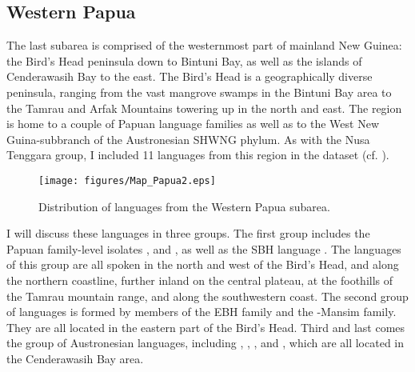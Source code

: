 \subsection{Western Papua}\label{sec:westpapua2}

The last subarea is comprised of the westernmost part of mainland New Guinea: the Bird's Head peninsula down to Bintuni Bay, as well as the islands of Cenderawasih Bay to the east. The Bird's Head is a geographically diverse peninsula, ranging from the vast mangrove swamps in the Bintuni Bay area to the Tamrau and Arfak Mountains towering up in the north and east. The region is home to a couple of Papuan language families as well as to the West New Guina-subbranch of the Austronesian SHWNG phylum. As with the Nusa Tenggara group, I included 11 languages from this region in the dataset (cf. ). 

\begin{figure} 
\texttt{[image: figures/Map\_Papua2.eps]}
\caption{Distribution of languages from the Western Papua subarea.}\label{map:Pap}
\end{figure}

\newpage 
I will discuss these languages in three groups. The first group includes the Papuan family-level isolates ,  and , as well as the \textsc{SBH} language . The languages of this group are all spoken in the north and west of the Bird's Head,  and  along the northern coastline,  further inland on the central plateau, at the foothills of the Tamrau mountain range, and  along the southwestern coast. The second group of languages is formed by members of the EBH family and the -Mansim family. They are all located in the eastern part of the Bird's Head. Third and last comes the group of Austronesian languages, including , , , and , which are all located in the Cenderawasih Bay area.

